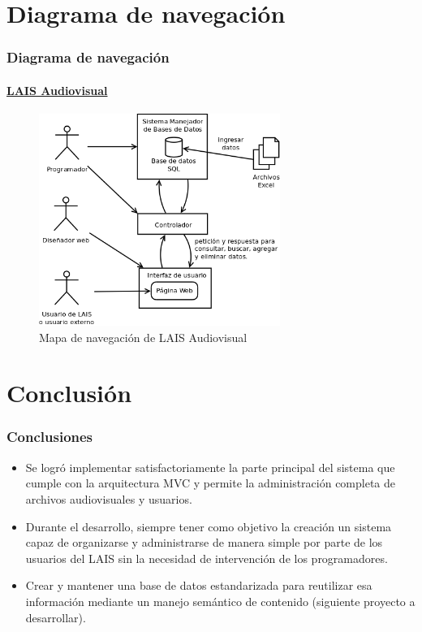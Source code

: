 \documentclass{beamer}
\begin{document}
\section{Diagrama de navegación}
\begin{frame}
	\frametitle{Diagrama de navegación}
	\framesubtitle{\href{http://localhost/lais-audiovisual/public/}{LAIS Audiovisual}}	
	\begin{figure}[H]
		\centering
		\includegraphics[width=0.7\textwidth]{EsquemaGeneral.png} %
		\caption{Mapa de navegación de LAIS Audiovisual}
		\label{fig:esquema_general}
	\end{figure}
\end{frame}

\section{Conclusión}
\begin{frame}
	\frametitle{Conclusiones}
	\begin{itemize}
		\item Se logró implementar satisfactoriamente la parte principal del sistema que cumple con la arquitectura MVC y permite la administración completa de archivos audiovisuales y usuarios.
		\item Durante el desarrollo, siempre tener como objetivo la creación un sistema capaz de organizarse y administrarse de manera simple por parte de los usuarios del LAIS sin la necesidad de intervención de los programadores.
		\item Crear y mantener una base de datos estandarizada para reutilizar esa información mediante un manejo semántico de contenido (siguiente proyecto a desarrollar).
	\end{itemize}
\end{frame}
\end{document}
